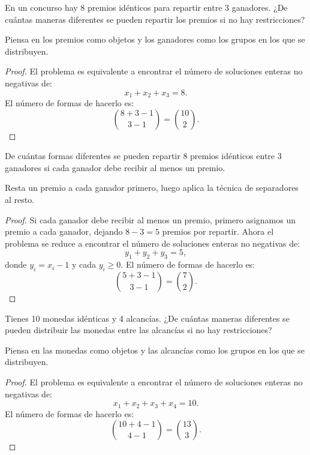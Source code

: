 \documentclass[11pt]{scrartcl}
\begin{document}
\begin{problem}
En un concurso hay 8 premios idénticos para repartir entre 3 ganadores. ¿De cuántas maneras diferentes se pueden repartir los premios si no hay restricciones?
\begin{hint}
Piensa en los premios como objetos y los ganadores como los grupos en los que se distribuyen.
\begin{proof}
El problema es equivalente a encontrar el número de soluciones enteras no negativas de:
\[ x_1 + x_2 + x_3 = 8. \]
El número de formas de hacerlo es:
\[ \binom{8+3-1}{3-1} = \binom{10}{2}. \]
\end{proof}
\end{hint}
\end{problem}

\begin{problem}
De cuántas formas diferentes se pueden repartir 8 premios idénticos entre 3 ganadores si cada ganador debe recibir al menos un premio.
\begin{hint}
Resta un premio a cada ganador primero, luego aplica la técnica de separadores al resto.
\begin{proof}
Si cada ganador debe recibir al menos un premio, primero asignamos un premio a cada ganador, dejando \(8 - 3 = 5\) premios por repartir. Ahora el problema se reduce a encontrar el número de soluciones enteras no negativas de:
\[ y_1 + y_2 + y_3 = 5, \]
donde \(y_i = x_i - 1\) y cada \(y_i \geq 0\). El número de formas de hacerlo es:
\[ \binom{5+3-1}{3-1} = \binom{7}{2}. \]
\end{proof}
\end{hint}
\end{problem}

\begin{problem}
Tienes 10 monedas idénticas y 4 alcancías. ¿De cuántas maneras diferentes se pueden distribuir las monedas entre las alcancías si no hay restricciones?
\begin{hint}
Piensa en las monedas como objetos y las alcancías como los grupos en los que se distribuyen.
\begin{proof}
El problema es equivalente a encontrar el número de soluciones enteras no negativas de:
\[ x_1 + x_2 + x_3 + x_4 = 10. \]
El número de formas de hacerlo es:
\[ \binom{10+4-1}{4-1} = \binom{13}{3}. \]
\end{proof}
\end{hint}
\end{problem}
\end{document}
